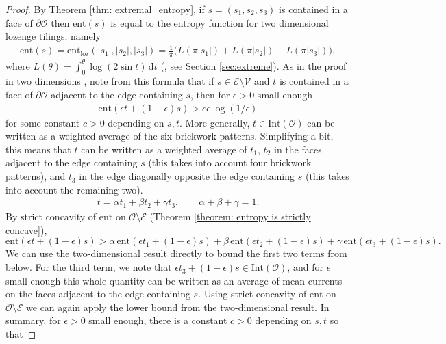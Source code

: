 \documentclass[11pt]{article}
\theoremstyle{remark}
\theoremstyle{definition}
\newcommand{\ent}{\text{ent}}
\newcommand{\mc}[1]{\mathcal{#1}}
\newcommand{\dd}{\mathrm{d}}
\begin{document}
\begin{proof}
    By Theorem \ref{thm: extremal_entropy}, if $s=(s_1,s_2,s_3)$ is contained in a face of $\partial \mc O$ then $\ent(s)$ is equal to the entropy function for two dimensional lozenge tilings, namely
    \begin{align*}
        \ent(s) = \ent_{\text{loz}}(|s_1|,|s_2|,|s_3|) = \frac{1}{\pi} \bigg( L( \pi |s_1|) + L(\pi|s_2|) + L(\pi |s_3|)\bigg),
    \end{align*}
    where $L(\theta) = \int_0^{\theta} \log (2 \sin t)\, \dd t$ (\cite{cohn2001variational}, see Section \ref{sec:extreme}). As in the proof in two dimensions \cite[Proposition 7.10]{gorin2021lectures}, note from this formula that if $s\in \mc E \setminus \mc V$ and $t$ is contained in a face of $\partial \mc O$ adjacent to the edge containing $s$, then for $\epsilon>0$ small enough
    \begin{align*}
        \ent( \epsilon t + (1-\epsilon) s ) > c \epsilon \log (1/\epsilon)
    \end{align*}
    for some constant $c>0$ depending on $s,t$. More generally, $t\in \text{Int}(\mc O)$ can be written as a weighted average of the six brickwork patterns. Simplifying a bit, this means that $t$ can be written as a weighted average of $t_1$, $t_2$ in the faces adjacent to the edge containing $s$ (this takes into account four brickwork patterns), and $t_3$ in the edge diagonally opposite the edge containing $s$ (this takes into account the remaining two).
    \begin{align*}
        t = \alpha t_1 + \beta t_2 + \gamma t_3, \qquad \alpha + \beta + \gamma = 1. 
    \end{align*}
    By strict concavity of $\ent$ on $\mc O \setminus \mc E$ (Theorem \ref{theorem: entropy is strictly concave}), 
    \begin{equation}
        \ent(\epsilon t + (1-\epsilon) s ) > \alpha\, \ent(\epsilon t_1 + (1-\epsilon) s ) + \beta\, \ent(\epsilon t_2 + (1-\epsilon) s ) + \gamma\, \ent(\epsilon t_3 + (1-\epsilon) s ).
    \end{equation}
    We can use the two-dimensional result directly to bound the first two terms from below. For the third term, we note that $\epsilon t_3 + (1-\epsilon) s\in \text{Int}(\mc O)$, and for $\epsilon$ small enough this whole quantity can be written as an average of mean currents on the faces adjacent to the edge containing $s$. Using strict concavity of $\ent$ on $\mc O\setminus \mc E$ we can again apply the lower bound from the two-dimensional result. In summary, for $\epsilon >0$ small enough, there is a constant $c>0$ depending on $s,t$ so that

\end{proof}
\end{document}
